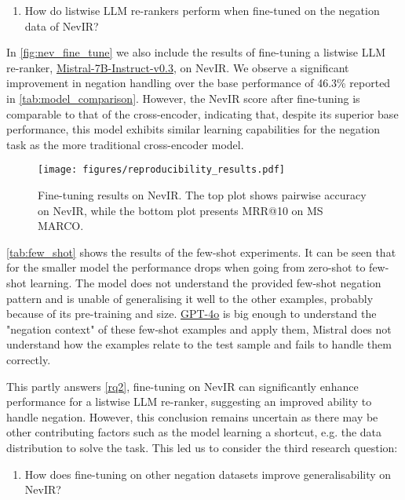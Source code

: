 \begin{enumerate}[label=\textbf{RQ\arabic*}, start=2]
    \item How do listwise LLM re-rankers perform when fine-tuned on the negation data of NevIR?\label{rq2}
\end{enumerate}


In \autoref{fig:nev_fine_tune} we also include the results of fine-tuning a listwise LLM re-ranker, \url{Mistral-7B-Instruct-v0.3}, on NevIR. We observe a significant improvement in negation handling over the base performance of 46.3\% reported in \autoref{tab:model_comparison}. However, the NevIR score after fine-tuning is comparable to that of the cross-encoder, indicating that, despite its superior base performance, this model exhibits similar learning capabilities for the negation task as the more traditional cross-encoder model.

\begin{figure}[tbp]
  \centering
  \texttt{[image: figures/reproducibility\_results.pdf]}
  \caption{Fine-tuning results on NevIR. The top plot shows pairwise accuracy on NevIR, while the bottom plot presents MRR@10 on MS MARCO.}
  \label{fig:nev_fine_tune}
\end{figure}


\autoref{tab:few_shot} shows the results of the few-shot experiments. It can be seen that for the smaller model the performance drops when going from zero-shot to few-shot learning. The model does not understand the provided few-shot negation pattern and is unable of generalising it well to the other examples, probably because of its pre-training and size. \url{GPT-4o} is big enough to understand the "negation context" of these few-shot examples and apply them, Mistral does not understand how the examples relate to the test sample and fails to handle them correctly.



This partly answers \ref{rq2}, fine-tuning on NevIR can significantly enhance performance for a listwise LLM re-ranker, suggesting an improved ability to handle negation. However, this conclusion remains uncertain as there may be other contributing factors such as the model learning a shortcut, e.g. the data distribution to solve the task. This led us to consider the third research question: 
\begin{enumerate}[label=\textbf{RQ\arabic*}, start=3]
    \item How does fine-tuning on other negation datasets improve generalisability on NevIR?\label{rq3}
\end{enumerate}



